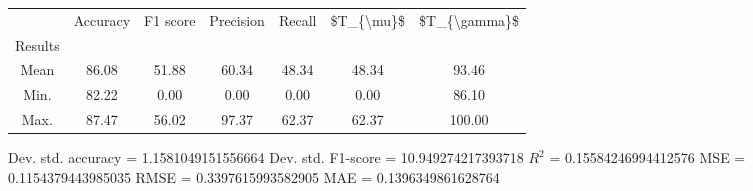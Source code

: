 \begin{tabular}{|c|c|c|c|c|c|c|}
\toprule
{} &  Accuracy &  F1 score &  Precision &  Recall &  \$T\_\{\textbackslash mu\}\$ &  \$T\_\{\textbackslash gamma\}\$ \\
Results &           &           &            &         &            &               \\
\hline
Mean    &     86.08 &     51.88 &      60.34 &   48.34 &      48.34 &         93.46 \\
Min.    &     82.22 &      0.00 &       0.00 &    0.00 &       0.00 &         86.10 \\
Max.    &     87.47 &     56.02 &      97.37 &   62.37 &      62.37 &        100.00 \\
\bottomrule
\end{tabular}

 Dev. std. accuracy = 1.1581049151556664
 Dev. std. F1-score = 10.949274217393718
 $R^2$ = 0.15584246994412576
 MSE = 0.1154379443985035
 RMSE = 0.3397615993582905
 MAE = 0.1396349861628764